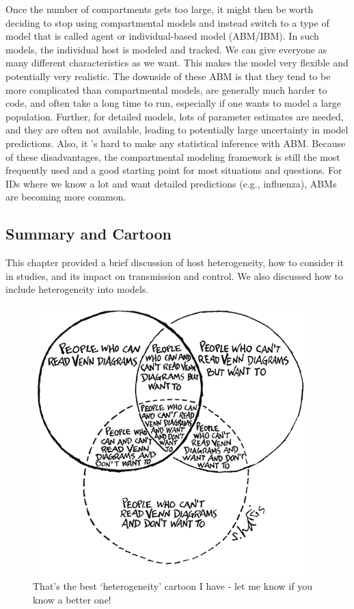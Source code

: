\documentclass[]{article}
\theoremstyle{definition}
\theoremstyle{definition}
\theoremstyle{definition}
\theoremstyle{remark}
\begin{document}
Once the number of compartments gets too large, it might then be worth
deciding to stop using compartmental models and instead switch to a type
of model that is called agent or individual-based model (ABM/IBM). In
such models, the individual host is modeled and tracked. We can give
everyone as many different characteristics as we want. This makes the
model very flexible and potentially very realistic. The downside of
these ABM is that they tend to be more complicated than compartmental
models, are generally much harder to code, and often take a long time to
run, especially if one wants to model a large population. Further, for
detailed models, lots of parameter estimates are needed, and they are
often not available, leading to potentially large uncertainty in model
predictions. Also, it 's hard to make any statistical inference with
ABM. Because of these disadvantages, the compartmental modeling
framework is still the most frequently used and a good starting point
for most situations and questions. For IDs where we know a lot and want
detailed predictions (e.g., influenza), ABMs are becoming more common.

\subsection{Summary and Cartoon}\label{summary-and-cartoon-9}

This chapter provided a brief discussion of host heterogeneity, how to
consider it in studies, and its impact on transmission and control. We
also discussed how to include heterogeneity into models.

\begin{figure}
\centering
\includegraphics{./images/crazyvenndiagram.gif}
\caption{That's the best `heterogeneity' cartoon I have - let me know if
you know a better one!}
\end{figure}
\end{document}

